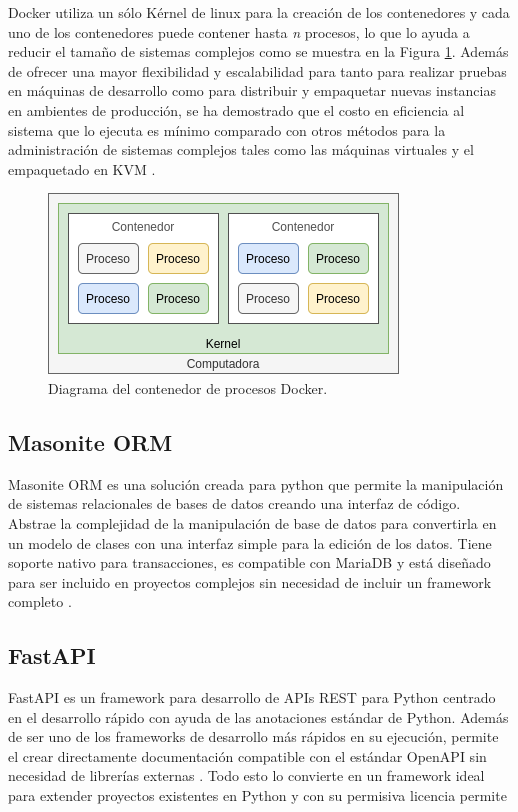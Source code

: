 Docker utiliza un sólo Kérnel de linux para la creación de los contenedores y cada uno de los contenedores puede contener hasta \textit{n} procesos, lo que lo ayuda a reducir el tamaño de sistemas complejos como se muestra en la Figura \ref{fig:docker_diagrama}. Además de ofrecer una mayor flexibilidad y escalabilidad para tanto para realizar pruebas en máquinas de desarrollo como para distribuir y empaquetar nuevas instancias en ambientes de producción, se ha demostrado que el costo en eficiencia al sistema que lo ejecuta es mínimo comparado con otros métodos para la administración de sistemas complejos tales como las máquinas virtuales y el empaquetado en KVM \cite{rad2017dockerAnalysis, felter2015comparsionPerformance}.

\begin{figure}[!ht]
	\centering
	\includegraphics[width=.45\linewidth]{images/diagrams/docker.drawio.png}
	\caption{Diagrama del contenedor de procesos Docker.}
	\label{fig:docker_diagrama}
\end{figure}

\subsection{Masonite ORM}

Masonite ORM es una solución creada para python que permite la manipulación de sistemas relacionales de bases de datos creando una interfaz de código. Abstrae la complejidad de la manipulación de base de datos para convertirla en un modelo de clases con una interfaz simple para la edición de los datos. Tiene soporte nativo para transacciones, es compatible con MariaDB y está diseñado para ser incluido en proyectos complejos sin necesidad de incluir un framework completo \cite{masonite_2021}.

\subsection{FastAPI}

FastAPI es un framework para desarrollo de APIs REST para Python centrado en el desarrollo rápido con ayuda de las anotaciones estándar de Python. Además de ser uno de los frameworks de desarrollo más rápidos en su ejecución, permite el crear directamente documentación compatible con el estándar OpenAPI sin necesidad de librerías externas \cite{fastapi_ramirez_2020}. Todo esto lo convierte en un framework ideal para extender proyectos existentes en Python y con su permisiva licencia permite %

